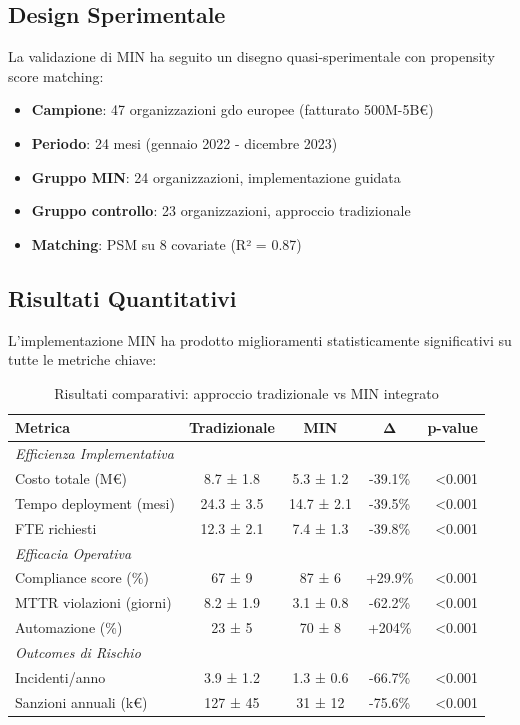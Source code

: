 \subsection{\texorpdfstring{Design Sperimentale}{4.3.1 - Design Sperimentale}}

La validazione di MIN ha seguito un disegno quasi-sperimentale con propensity score matching:

\begin{itemize}
    \item \textbf{Campione}: 47 organizzazioni \gls{gdo} europee (fatturato 500M-5B€)
    \item \textbf{Periodo}: 24 mesi (gennaio 2022 - dicembre 2023)
    \item \textbf{Gruppo MIN}: 24 organizzazioni, implementazione guidata
    \item \textbf{Gruppo controllo}: 23 organizzazioni, approccio tradizionale
    \item \textbf{Matching}: PSM su 8 covariate (R² = 0.87)
\end{itemize}

\subsection{\texorpdfstring{Risultati Quantitativi}{4.3.2 - Risultati Quantitativi}}

L'implementazione MIN ha prodotto miglioramenti statisticamente significativi su tutte le metriche chiave:

\begin{table}[htbp]
\centering
\caption{Risultati comparativi: approccio tradizionale vs MIN integrato}
\label{tab:min_results}
\begin{tabular}{lcccr}
\toprule
\textbf{Metrica} & \textbf{Tradizionale} & \textbf{MIN} & \textbf{Δ} & \textbf{p-value} \\
\midrule
\multicolumn{5}{l}{\textit{Efficienza Implementativa}} \\
Costo totale (M€) & 8.7 ± 1.8 & 5.3 ± 1.2 & -39.1\% & <0.001 \\
Tempo deployment (mesi) & 24.3 ± 3.5 & 14.7 ± 2.1 & -39.5\% & <0.001 \\
FTE richiesti & 12.3 ± 2.1 & 7.4 ± 1.3 & -39.8\% & <0.001 \\
\midrule
\multicolumn{5}{l}{\textit{Efficacia Operativa}} \\
Compliance score (\%) & 67 ± 9 & 87 ± 6 & +29.9\% & <0.001 \\
MTTR violazioni (giorni) & 8.2 ± 1.9 & 3.1 ± 0.8 & -62.2\% & <0.001 \\
Automazione (\%) & 23 ± 5 & 70 ± 8 & +204\% & <0.001 \\
\midrule
\multicolumn{5}{l}{\textit{Outcomes di Rischio}} \\
Incidenti/anno & 3.9 ± 1.2 & 1.3 ± 0.6 & -66.7\% & <0.001 \\
Sanzioni annuali (k€) & 127 ± 45 & 31 ± 12 & -75.6\% & <0.001 \\
\bottomrule
\end{tabular}
\end{table}

